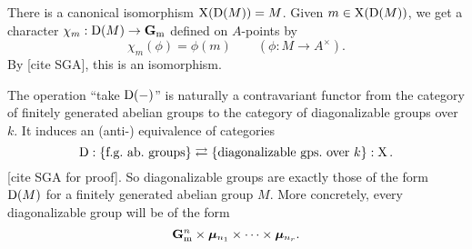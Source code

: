 There is a canonical isomorphism $\operatorname{X}(\operatorname{D}(M))=M$. Given 
$m\in \operatorname{X}(\operatorname{D}(M))$, we get a character $\chi_m:\operatorname{D}(M)\to\mathbf{G}_\mathrm{m}$ 
defined on $A$-points by 
\[
  \chi_m(\phi) = \phi(m) \qquad (\phi:M\to A^\times) .
\]
By [cite SGA], this is an isomorphism. 

The operation ``take $\operatorname{D}(-)$'' is naturally a contravariant functor from the 
category of finitely generated abelian groups to the category of diagonalizable 
groups over $k$. It induces an (anti-) equivalence of categories 
\[
  \operatorname{D}:\{\text{f.g.~ab.~groups}\} \rightleftarrows \{\text{diagonalizable gps.~over $k$}\}: \operatorname{X} .
\]
[cite SGA for proof]. So diagonalizable groups are exactly those of the form 
$\operatorname{D}(M)$ for a finitely generated abelian group $M$. More concretely, every 
diagonalizable group will be of the form 
\[
  \mathbf{G}_\mathrm{m}^n \times \bm{\mu}_{n_1} \times \cdots \times \bm{\mu}_{n_r} .
\]




